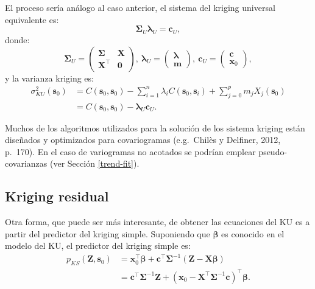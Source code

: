 \documentclass[
  spanish,
]{book}
\theoremstyle{break}
\theoremstyle{definition}
\theoremstyle{definition}
\theoremstyle{definition}
\theoremstyle{definition}
\theoremstyle{remark}
\begin{document}
El proceso sería análogo al caso anterior, el sistema del kriging universal equivalente es:
\[\boldsymbol{\Sigma}_{U} \boldsymbol{\lambda}_{U} = \mathbf{c}_{U},\]
donde:
\[\boldsymbol{\Sigma}_{U} =\left( 
\begin{array}{lc}
\boldsymbol{\Sigma} & \mathbf{X} \\
\mathbf{X^\top } & \mathbf{0}
\end{array}
\right) ,\ 
\boldsymbol{\lambda}_{U} =\left( \begin{array}{c}
\boldsymbol{\lambda} \\
\mathbf{m}
\end{array} \right) ,\ 
\mathbf{c}_{U} =\left( \begin{array}{c}
\mathbf{c} \\
\mathbf{x}_0
\end{array} \right),\]
y la varianza kriging es:
\[\begin{aligned}
\sigma_{KU}^{2} (\mathbf{s}_{0}) 
& = C(\mathbf{s}_{0},\mathbf{s}_{0}) - \sum\limits_{i=1}^{n}\lambda_{i}  C(\mathbf{s}_{0},\mathbf{s}_{i}) + \sum\limits_{j=0}^{p}m_{j} X_{j}(\mathbf{s}_{0}) \\
& = C(\mathbf{s}_{0}, \mathbf{s}_{0}) - \boldsymbol{\lambda}_{U} \mathbf{c}_{U}.
\end{aligned}\]

Muchos de los algoritmos utilizados para la solución de los sistema kriging están diseñados y optimizados para covariogramas (e.g.~Chilès y Delfiner, 2012, p.~170).
En el caso de variogramas no acotados se podrían emplear pseudo-covarianzas (ver Sección \ref{trend-fit}).

\hypertarget{kriging-residual}{%
\subsection{Kriging residual}\label{kriging-residual}}

Otra forma, que puede ser más interesante, de obtener las ecuaciones del KU es a partir del predictor del kriging simple.
Suponiendo que \(\boldsymbol{\beta}\) es conocido en el modelo del KU, el predictor del kriging simple es:
\[\begin{aligned}
p_{KS} (\mathbf{Z},\mathbf{s}_{0})
& = \mathbf{x}_0^{\top}\boldsymbol{\beta} + \mathbf{c}^{\top} \boldsymbol{\Sigma}^{-1} \left( \mathbf{Z} - \mathbf{X}\boldsymbol{\beta} \right) \\
& =\mathbf{c^\top }\boldsymbol{\Sigma}^{-1}
\mathbf{Z}+(\mathbf{x}_0-\mathbf{X^\top }\boldsymbol{\Sigma}^{-1} \mathbf{c})^\top \boldsymbol{\beta}.
\end{aligned}\]
\end{document}
